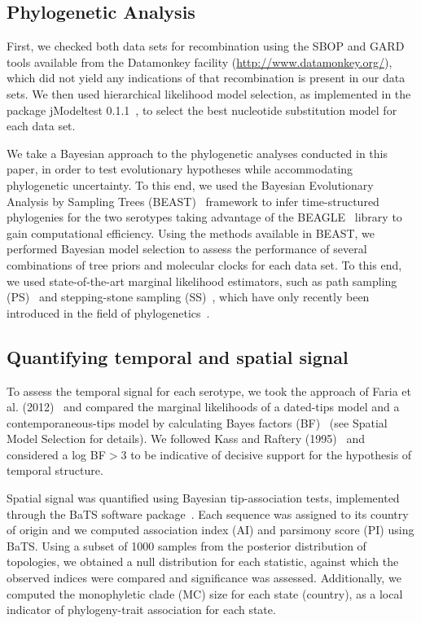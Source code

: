 \documentclass[10pt]{article}
\begin{document}
\subsection*{Phylogenetic Analysis}

First, we checked both data sets for recombination using the SBOP and GARD~\cite{sbpgard} tools available from the Datamonkey facility (\url{http://www.datamonkey.org/}), which did not yield any indications of that recombination is present in our data sets.
We then used hierarchical likelihood model selection, as implemented in the package jModeltest 0.1.1~\cite{jmodel}, to select the best nucleotide substitution model for each data set.

We take a Bayesian approach to the phylogenetic analyses conducted in this paper, in order to test evolutionary hypotheses while accommodating phylogenetic uncertainty. 
To this end, we used the Bayesian Evolutionary Analysis by Sampling Trees (BEAST)~\cite{beast2012} framework to infer time-structured phylogenies for the two serotypes taking advantage of the  BEAGLE~\cite{BEAGLE} library to gain computational efficiency.
Using the methods available in BEAST, we performed Bayesian model selection to assess the performance of several combinations of tree priors and molecular clocks for each data set.
To this end, we used state-of-the-art marginal likelihood estimators, such as path sampling (PS)~\cite{LartillotPhilippe} and stepping-stone sampling (SS)~\cite{Xie}, which have only recently been introduced in the field of phylogenetics~\cite{LartillotPhilippe, Xie, Baele2012, Baele2013a, Baele2013b}.

\subsection*{Quantifying temporal and spatial signal} 

To assess the temporal signal for each serotype, we took the approach of Faria et al. (2012)~\cite{Faria2012} and compared the marginal likelihoods of a dated-tips model and a contemporaneous-tips model by calculating Bayes factors (BF)~\cite{Suchard2001, suchard2005models} (see Spatial Model Selection for details).
We followed Kass and Raftery (1995)~\cite{KassRaftery1995} and considered a log BF$>$3 to be indicative of decisive support for the hypothesis of temporal structure.

Spatial signal was quantified using Bayesian tip-association tests, implemented through the BaTS software package~\cite{bats}.
Each sequence was assigned to its country of origin and we computed association index (AI) and parsimony score (PI) using BaTS.
Using a subset of 1000 samples from the posterior distribution of topologies, we obtained a null distribution for each statistic, against which the observed indices were compared and significance was assessed.
Additionally, we computed the monophyletic clade (MC) size for each state (country), as a local indicator of phylogeny-trait association for each state.
\end{document}
